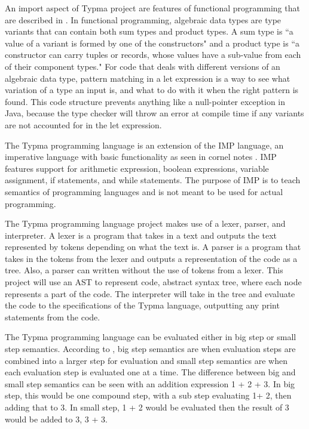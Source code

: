\documentclass[10pt,twocolumn]{article}
\begin{document}
An import aspect of Typma project are features of functional programming that are described in \textcite{OCaml}. In functional programming, algebraic data types are type variants that can contain both sum types and product types. A sum type is ``a value of a variant is formed by one of the constructors" and a product type is ``a constructor can carry tuples or records, whose values have a sub-value from each of their component types." For code that deals with different versions of an algebraic data type, pattern matching in a let expression is a way to see what variation of a type an input is, and what to do with it when the right pattern is found. This code structure prevents anything like a null-pointer exception in Java, because the type checker will throw an error at compile time if any variants are not accounted for in the let expression.

The Typma programming language is an extension of the IMP language, an imperative language with basic functionality as seen in cornel notes \textcite{CS4110IMP}. IMP features support for arithmetic expression, boolean expressions, variable assignment, if statements, and while statements. The purpose of IMP is to teach semantics of programming languages and is not meant to be used for actual programming.

The Typma programming language project makes use of a lexer, parser, and interpreter. A lexer is a program that takes in a text and outputs the text represented by tokens depending on what the text is. A parser is a program that takes in the tokens from the lexer and outputs a representation of the code as a tree. Also, a parser can written without the use of tokens from a lexer. This project will use an AST to represent code, abstract syntax tree, where each node represents a part of the code. The interpreter will take in the tree and evaluate the code to the specifications of the Typma language, outputting any print statements from the code.

The Typma programming language can be evaluated either in big step or small step semantics. According to \textcite{CS4110IMP}, big step semantics are when evaluation steps are combined into a larger step for evaluation and small step semantics are when each evaluation step is evaluated one at a time. The difference between big and small step semantics can be seen with an addition expression 1 + 2 + 3. In big step, this would be one compound step, with a sub step evaluating 1+ 2, then adding that to 3. In small step, 1 + 2 would be evaluated then the result of 3 would be added to 3, 3 + 3.
\end{document}
